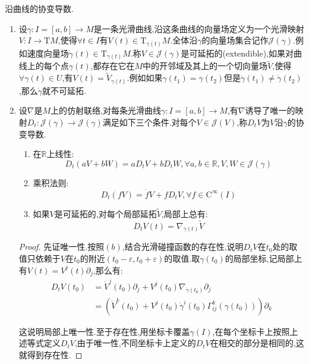 沿曲线的协变导数.
\begin{enumerate}
	\item 设$\gamma:I=[a,b]\to M$是一条光滑曲线,沿这条曲线的向量场定义为一个光滑映射$V:I\to\mathrm{T}M$,使得$\forall t\in I$有$V(t)\in\mathrm{T}_{\gamma(t)}M$.全体沿$\gamma$的向量场集合记作$\mathcal{J}(\gamma)$.例如速度向量场$\dot{\gamma}(t)\in\mathrm{T}_{\gamma(t)}M$.称$V\in\mathcal{J}(\gamma)$是可延拓的(extendible),如果对曲线上的每个点$\gamma(t)$,都存在它在$M$中的开邻域及其上的一个切向量场$\widetilde{V}$,使得$\forall\gamma(t)\in U$,有$V(t)=\widetilde{V}_{\gamma(t)}$.例如如果$\gamma(t_1)=\gamma(t_2)$但是$\dot{\gamma}(t_1)\not=\dot{\gamma}(t_2)$,那么$\dot{\gamma}$就不可延拓.
	\item 设$\nabla$是$M$上的仿射联络,对每条光滑曲线$\gamma:I=[a,b]\to M$,有$\nabla$诱导了唯一的映射$D_t:\mathcal{J}(\gamma)\to\mathcal{J}(\gamma)$满足如下三个条件.对每个$V\in\mathcal{J}(V)$,称$D_tV$为$V$沿$\gamma$的协变导数.
	\begin{enumerate}
		\item 在$\mathbb{R}$上线性:
		$$D_t(aV+bW)=aD_tV+bD_tW,\forall a,b\in\mathbb{R},V,W\in\mathcal{J}(\gamma)$$
		\item 乘积法则:
		$$D_t(fV)=\dot{f}V+fD_tV,\forall f\in\mathrm{C}^{\infty}(I)$$
		\item 如果$V$是可延拓的,对每个局部延拓$\widetilde{V}$,局部上总有:
		$$D_tV(t)=\nabla_{\dot{\gamma}(t)}\widetilde{V}$$
	\end{enumerate}
    \begin{proof}
    	
    	先证唯一性.按照$(b)$,结合光滑碰撞函数的存在性,说明$D_tV$在$t_0$处的取值只依赖于$V$在$t_0$的附近$(t_0-\varepsilon,t_0+\varepsilon)$的取值.取$\gamma(t_0)$的局部坐标,记局部上有$V(t)=V^j(t)\partial_j$,那么有:
    	\begin{align*}
    		D_tV(t_0)&=\dot{V}^j(t_0)\partial_j+V^j(t_0)\nabla_{\dot{\gamma}(t_0)}\partial_j\\&=\left(\dot{V}^k(t_0)+V^j(t_0)\dot{\gamma}^i(t_0)\Gamma_{ij}^k(\gamma(t_0))\right)\partial_k
    	\end{align*}
    
        这说明局部上唯一性.至于存在性,用坐标卡覆盖$\gamma(I)$,在每个坐标卡上按照上述等式定义$D_tV$,由于唯一性,不同坐标卡上定义的$D_tV$在相交的部分是相同的,这就得到存在性.
    \end{proof}
\end{enumerate}


